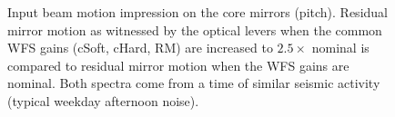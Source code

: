 \begin{figure}
\begin{centering}
\caption[Impression of input beam motion on the core mirrors]{Input
  beam motion impression on the core mirrors (pitch). Residual mirror motion
  as witnessed by the optical levers when the common WFS gains (cSoft,
  cHard, RM) are increased to $2.5\times$ nominal is compared to residual
  mirror motion when the WFS gains are nominal. Both spectra come from
  a time of similar seismic activity (typical weekday afternoon
  noise).}
\label{fig:inputbeam_impression}
\end{centering}
\end{figure}


\begin{figure}
\begin{centering}

\end{centering}
\end{figure}
